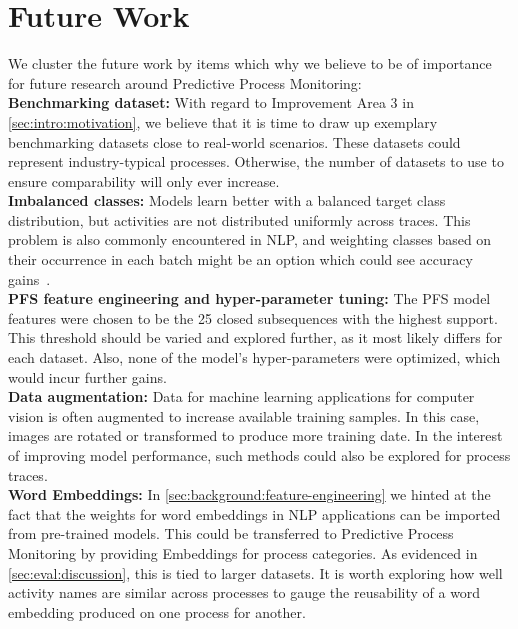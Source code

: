 \section{Future Work} \label{sec:conclusion:future-work}
We cluster the future work by items which why we believe to be of importance for future research around Predictive Process Monitoring:\\

\noindent\textbf{Benchmarking dataset:} With regard to Improvement Area 3 in \autoref{sec:intro:motivation}, we believe that it is time to draw up exemplary benchmarking datasets close to real-world scenarios. These datasets could represent industry-typical processes. Otherwise, the number of datasets to use to ensure comparability will only ever increase.\\

\noindent\textbf{Imbalanced classes:} Models learn better with a balanced target class distribution, but activities are not distributed uniformly across traces. This problem is also commonly encountered in NLP, and weighting classes based on their occurrence in each batch might be an option which could see accuracy gains~\cite{web:stackoverflow-keras-class-weights}.\\

\noindent\textbf{PFS feature engineering and hyper-parameter tuning:} The PFS model features were chosen to be the 25 closed subsequences with the highest support. This threshold should be varied and explored further, as it most likely differs for each dataset. Also, none of the model's hyper-parameters were optimized, which would incur further gains.\\

\noindent\textbf{Data augmentation:} Data for machine learning applications for computer vision is often augmented to increase available training samples. In this case, images are rotated or transformed to produce more training date. In the interest of improving model performance, such methods could also be explored for process traces.\\

\noindent\textbf{Word Embeddings:} In \autoref{sec:background:feature-engineering} we hinted at the fact that the weights for word embeddings in NLP applications can be imported from pre-trained models. This could be transferred to Predictive Process Monitoring by providing Embeddings for process categories. As evidenced in \autoref{sec:eval:discussion}, this is tied to larger datasets. It is worth exploring how well activity names are similar across processes to gauge the reusability of a word embedding produced on one process for another.

